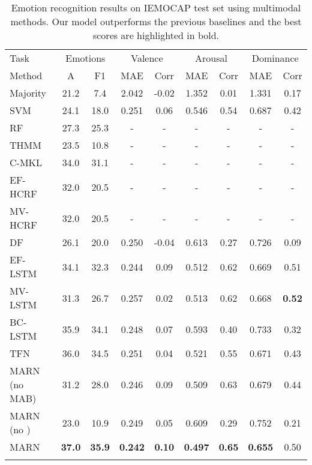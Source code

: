 \documentclass[letterpaper]{article} \usepackage{aaai18}  \usepackage{times}  \usepackage{helvet}  \usepackage{courier}  \usepackage{url}  \usepackage{graphicx}  \usepackage{multirow}
\newcommand{\pipelines}{MARN}
\begin{document}
\begin{table}[tb]
\fontsize{7}{10}\selectfont
\centering
\setlength\tabcolsep{0.16pt}
\begin{tabular}{l c c c c c c c c}
\Xhline{3\arrayrulewidth}
Task       		& \multicolumn{2}{c}{Emotions} & \multicolumn{2}{c}{Valence} & \multicolumn{2}{c}{Arousal} & \multicolumn{2}{c}{Dominance} \\
Method        	& A & F1 & MAE & Corr & MAE & Corr & MAE & Corr  \\ \Xhline{0.5\arrayrulewidth}
Majority		& 21.2 & 7.4	& 2.042 & -0.02 & 1.352 & 0.01 & 1.331 & 0.17	\\
SVM     		& 24.1 & 18.0 & 0.251 & 0.06 & 0.546 & 0.54 & 0.687 & 0.42 \\
RF     			& 27.3 & 25.3 &- & - &- &- &- &- \\
THMM			& 23.5 & 10.8 & - & - &- &- &- &- \\
C-MKL			& 34.0 & 31.1 & - & - & - & - & - & -  \\
EF-HCRF			& 32.0 & 20.5 & - & - &- &- &- &- \\
MV-HCRF			& 32.0 & 20.5 & - & - &- &- &- &- \\
DF   			& 26.1 & 20.0 & 0.250 & -0.04 & 0.613 & 0.27 & 0.726 & 0.09 \\
EF-LSTM	& 34.1 & 32.3 & 0.244 & 0.09 & 0.512 & 0.62 & 0.669 & 0.51\\
MV-LSTM   		& 31.3 & 26.7 & 0.257 & 0.02 & 0.513 & 0.62 & 0.668 & \textbf{0.52}\\
BC-LSTM    		& 35.9 & 34.1 & 0.248 & 0.07 & 0.593 & 0.40 & 0.733 & 0.32 \\ 
TFN      		& 36.0	& 34.5 & 0.251 & 0.04 & 0.521 & 0.55 & 0.671 & 0.43 \\  \Xhline{0.5\arrayrulewidth}
{\pipelines } (no MAB)		&  31.2 & 28.0 & 0.246 & 0.09 & 0.509 & 0.63 & 0.679 & 0.44\\ 
{\pipelines } (no ) 	& 23.0 & 10.9 & 0.249 & 0.05 & 0.609 & 0.29 & 0.752 & 0.21 \\
{\pipelines }			& \textbf{37.0} & \textbf{35.9} & \textbf{0.242} & \textbf{0.10} & \textbf{0.497} & \textbf{0.65} & \textbf{0.655} & 0.50\\ \Xhline{3\arrayrulewidth}
\end{tabular}
\caption{Emotion recognition results on IEMOCAP test set using multimodal methods. Our model outperforms the previous baselines and the best scores are highlighted in bold.}
\label{table:iemocap}
\end{table}
\end{document}
